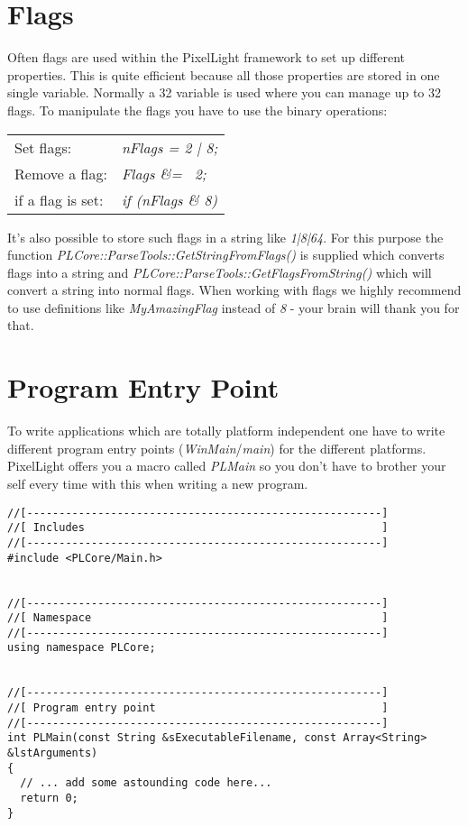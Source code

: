 \section{Flags}
Often flags are used within the PixelLight framework to set up different properties. This is quite efficient because all those properties are stored in one single variable. Normally a \SI{32}{\bit} variable is used where you can manage up to 32 flags. To manipulate the flags you have to use the binary operations:
\begin{tabular}{ll}
Set flags:&
  \emph{nFlags = 2 | 8;}\\
Remove a flag:&
  \emph{Flags \&= ~2;}\\
if a flag is set:&
  \emph{if (nFlags \& 8)}\\
\end{tabular}
It's also possible to store such flags in a string like \emph{1|8|64}. For this purpose the function \emph{PLCore::ParseTools::GetStringFromFlags()} is supplied which converts flags into a string and \emph{PLCore::ParseTools::GetFlagsFromString()} which will convert a string into normal flags. When working with flags we highly recommend to use definitions like \emph{MyAmazingFlag} instead of \emph{8} - your brain will thank you for that.




\section{Program Entry Point}
To write applications which are totally platform independent one have to write different program entry points (\emph{WinMain}/\emph{main}) for the different platforms. PixelLight offers you a macro called \emph{PLMain} so you don't have to brother your self every time with this when writing a new program.

\begin{lstlisting}[caption=Program entry point example]
//[-------------------------------------------------------]
//[ Includes                                              ]
//[-------------------------------------------------------]
#include <PLCore/Main.h>


//[-------------------------------------------------------]
//[ Namespace                                             ]
//[-------------------------------------------------------]
using namespace PLCore;


//[-------------------------------------------------------]
//[ Program entry point                                   ]
//[-------------------------------------------------------]
int PLMain(const String &sExecutableFilename, const Array<String> &lstArguments)
{
  // ... add some astounding code here...
  return 0;
}
\end{lstlisting}

